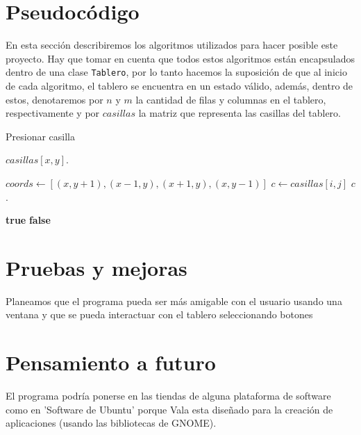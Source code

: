 \documentclass{article}
\begin{document}
    \section{Pseudocódigo}

	En esta sección describiremos los algoritmos utilizados para hacer posible
	este proyecto. Hay que tomar en cuenta que todos estos algoritmos están
	encapsulados dentro de una clase \texttt{Tablero}, por lo tanto hacemos la
	suposición de que al inicio de cada algoritmo, el tablero se encuentra en un
	estado válido, además, dentro de estos, denotaremos por $n$ y $m$ la
	cantidad de filas y columnas en el tablero, respectivamente y por $casillas$
	la matriz que representa las casillas del tablero.


	\begin{algorithm}
	\caption{Presionar casilla} \label{alg:presionar}
	\begin{algorithmic}[1]

	\Require {}
	\State $casillas[x,y]$.
	\State {}
	\EndProcedure

	\State \Return
	\EndIf
	\State $coords \gets [ (x,y+1), (x-1,y), (x+1,y), (x,y-1) ]$
	\State $c \gets casillas[i,j]$
	\State $c$.
	\State {}
	\EndIf
	\EndIf
	\EndFor
	\EndProcedure

	\State \Return \textbf{true}
	\EndIf
	\State \Return \textbf{false}
	\EndProcedure
	\end{algorithmic}
	\end{algorithm}


    \section{Pruebas y mejoras}    
    Planeamos que el programa pueda ser más amigable con el usuario usando una ventana y que se pueda interactuar con el tablero seleccionando botones

    \section{Pensamiento a futuro}
    El programa podría ponerse en las tiendas de alguna plataforma de software como en 'Software de Ubuntu' porque Vala esta diseñado para la creación de aplicaciones (usando las bibliotecas de GNOME).
\end{document}
